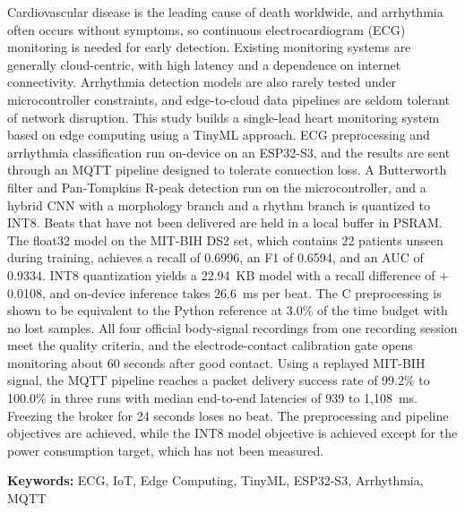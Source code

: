 Cardiovascular disease is the leading cause of death worldwide, and arrhythmia often occurs without symptoms, so continuous electrocardiogram (ECG) monitoring is needed for early detection. Existing monitoring systems are generally cloud-centric, with high latency and a dependence on internet connectivity. Arrhythmia detection models are also rarely tested under microcontroller constraints, and edge-to-cloud data pipelines are seldom tolerant of network disruption. This study builds a single-lead heart monitoring system based on edge computing using a TinyML approach. ECG preprocessing and arrhythmia classification run on-device on an ESP32-S3, and the results are sent through an MQTT pipeline designed to tolerate connection loss. A Butterworth filter and Pan-Tompkins R-peak detection run on the microcontroller, and a hybrid CNN with a morphology branch and a rhythm branch is quantized to INT8. Beats that have not been delivered are held in a local buffer in PSRAM. The float32 model on the MIT-BIH DS2 set, which contains 22 patients unseen during training, achieves a recall of 0.6996, an F1 of 0.6594, and an AUC of 0.9334. INT8 quantization yields a 22.94~KB model with a recall difference of $+$0.0108, and on-device inference takes 26.6~ms per beat. The C preprocessing is shown to be equivalent to the Python reference at 3.0\% of the time budget with no lost samples. All four official body-signal recordings from one recording session meet the quality criteria, and the electrode-contact calibration gate opens monitoring about 60 seconds after good contact. Using a replayed MIT-BIH signal, the MQTT pipeline reaches a packet delivery success rate of 99.2\% to 100.0\% in three runs with median end-to-end latencies of 939 to 1,108~ms. Freezing the broker for 24 seconds loses no beat. The preprocessing and pipeline objectives are achieved, while the INT8 model objective is achieved except for the power consumption target, which has not been measured.

\vspace{0.25cm}
\noindent
\textbf{Keywords:} ECG, IoT, Edge Computing, TinyML, ESP32-S3, Arrhythmia, MQTT

\clearpage
